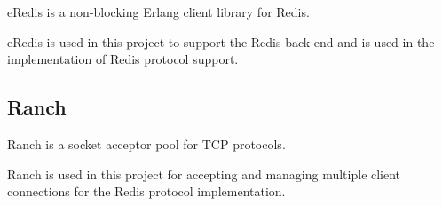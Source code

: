 eRedis \citep{eredis} is a non-blocking Erlang client library for Redis.

eRedis is used in this project to support the Redis back end and is used in the
implementation of Redis protocol support.

\subsection{Ranch}

Ranch \citep{ranch} is a socket acceptor pool for TCP protocols.

Ranch is used in this project for accepting and managing multiple client
connections for the Redis protocol implementation.

